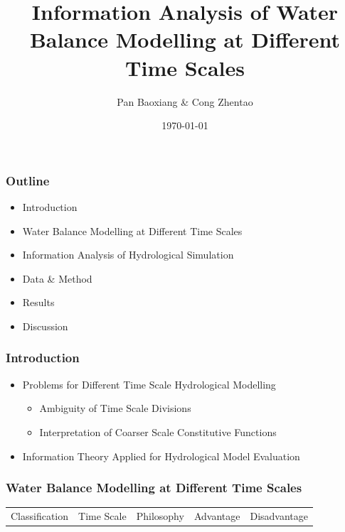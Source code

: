 \documentclass{beamer}
\begin{document}
\begin{CJK}{UTF8}{gkai} 
\title{Information Analysis of Water Balance Modelling at Different Time Scales }
\author{Pan Baoxiang \& Cong Zhentao}
\date{\today}
\maketitle

\begin{frame}
\frametitle{Outline}
\begin{itemize}
\item Introduction
\item Water Balance Modelling at Different Time Scales
\item Information Analysis of Hydrological Simulation
\item Data \& Method
\item Results
\item Discussion
\end{itemize}
\end{frame}

\begin{frame}
\frametitle{Introduction}
\begin{itemize}
\item Problems for Different Time Scale Hydrological Modelling 
\begin{itemize}
\item Ambiguity of Time Scale Divisions 
\item Interpretation of Coarser Scale Constitutive Functions
\end{itemize}
\item Information Theory Applied for Hydrological Model Evaluation
\end{itemize}
\end{frame}


\begin{frame}
\frametitle{Water Balance Modelling at Different Time Scales}
\begin{table}[H]\tiny
\begin{center}
\begin{tabular}{l cccc}
\toprule
Classification  & Time Scale & Philosophy & Advantage & Disadvantage \\


\end{tabular}
\end{center}
\end{table}
\end{frame}
\end{CJK}
\end{document}
